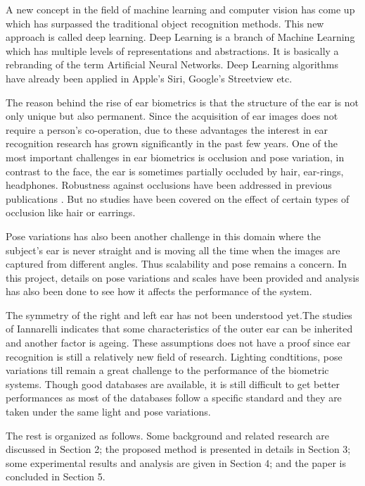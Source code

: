  A new concept in the field of machine learning and computer vision has come up which has surpassed the traditional object recognition methods. This new approach is called deep learning. Deep Learning is a branch of Machine Learning which has multiple levels of representations and abstractions. It is basically a rebranding of the term Artificial Neural Networks. Deep Learning algorithms have already been applied in Apple's Siri, Google's Streetview etc. 
 
 The reason behind the rise of ear biometrics is that the structure of the ear is not only unique but also permanent. Since the acquisition of ear images does not require a person's co-operation, due to these advantages the interest in ear recognition research has grown significantly in the past few years. One of the most important challenges in ear biometrics is occlusion and pose variation, in contrast to the face, the ear is sometimes partially occluded by hair, ear-rings, headphones. Robustness against occlusions have been addressed in previous publications \cite{pflug2012ear}. But no studies have been covered on the effect of certain types of occlusion like hair or earrings. 
 
 Pose variations has also been another challenge in this domain where the subject's ear is never straight and is moving all the time when the images are captured from different angles. Thus scalability and pose remains a concern. In this project, details on pose variations and scales have been provided and analysis has also been done to see how it affects the performance of the system.
 
 The symmetry of the right and left ear has not been understood yet.The studies of Iannarelli indicates that some characteristics of the outer ear can be inherited and another factor is ageing. These assumptions does not have a proof since ear recognition is still a relatively new field of research. Lighting condtitions, pose variations till remain a great challenge to the performance of the biometric systems. Though good databases are available, it is still difficult to get better performances as most of the databases follow a specific standard and they are taken under the same light and pose variations.
 
 

The rest  is organized as follows. Some background and related research are discussed in Section 2; the proposed method is presented in details in Section 3; some experimental results and analysis are given in Section 4; and the paper is concluded in Section 5.
